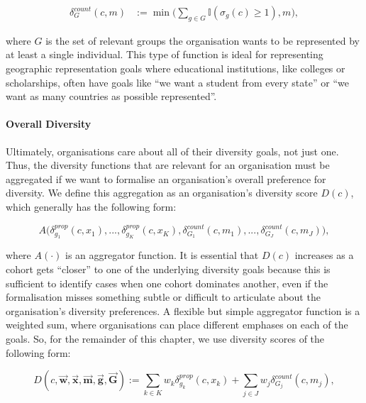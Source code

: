 \begin{equation} 
    \begin{split}
        \delta_G^{count}(c,m) &:= \min\big(\sum_{g \in G}\mathbb{I}(\sigma_g(c)\geq 1), m\big), \label{eq:count_div_function}
    \end{split}
\end{equation}

\noindent where $G$ is the set of relevant groups the organisation wants to be represented by at least a single individual. This type of function is ideal for representing geographic representation goals where educational institutions, like colleges or scholarships, often have goals like ``we want a student from every state'' or ``we want as many countries as possible represented''. 

\paragraph{Overall Diversity} Ultimately, organisations care about all of their diversity goals, not just one. Thus, the diversity functions that are relevant for an organisation must be aggregated if we want to formalise an organisation's overall preference for diversity. We define this aggregation as an organisation's diversity score $D(c)$, which generally has the following form: 

\begin{equation}
A\big(\delta_{g_1}^{prop}(c,x_1),...,\delta_{g_K}^{prop}(c,x_K),\delta_{G_1}^{count}(c, m_1),...,\delta_{G_J}^{count}(c, m_J)\big), \nonumber
\end{equation}

\noindent where $A(\cdot)$ is an aggregator function. It is essential that $D(c)$ increases as a cohort gets ``closer'' to one of the underlying diversity goals because this is sufficient to identify cases when one cohort dominates another, even if the formalisation misses something subtle or difficult to articulate about the organisation's diversity preferences. A flexible but simple aggregator function is a weighted sum, where organisations can place different emphases on each of the goals. So, for the remainder of this chapter, we use diversity scores of the following form: 

\begin{equation}\label{eq:d_equation}
D(c,\vec{\mathbf{w}},\vec{\mathbf{x}},\vec{\mathbf{m}}, \vec{\mathbf{g}}, \vec{\mathbf{G}}) := \sum_{k\in K}w_k\delta_{g_k}^{prop}(c,x_k) + \sum_{j \in J}w_j\delta_{G_j}^{count}(c, m_j),
\end{equation}

